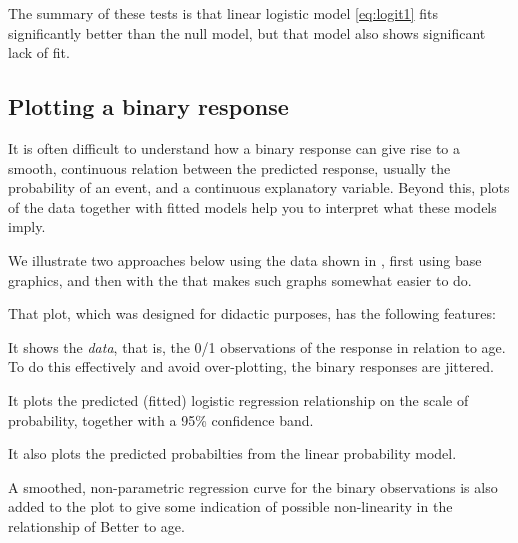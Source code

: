 \documentclass[11pt]{book}
\begin{document}
\begin{itemize}
The summary of these tests is that linear logistic model \eqref{eq:logit1}
fits significantly better than the null model, but that model also shows
significant lack of fit.
\end{itemize}



\subsection{Plotting a binary response}\label{logist:plotting}

It is often difficult to understand how a binary response can give rise to
a smooth, continuous relation between the predicted response, usually
the probability of an event, and a continuous explanatory variable.
Beyond this, plots of the data together with fitted models 
help you to interpret what these models imply.

We illustrate two approaches below using the  data
shown in , first using \R base graphics, and
then with the  that makes such graphs somewhat easier to do.

That plot, which was designed for didactic purposes, has the following features:
\begin{itemize*}
  \item It shows the \emph{data}, that is, the 0/1 observations of the 
  response in relation to age. To do this effectively and avoid over-plotting, the
  binary responses are jittered.
  \item It plots the predicted (fitted) logistic regression relationship on the scale
  of probability, together with a 95\% confidence band.
  \item It also plots the predicted probabilties from the linear probability model.
  \item A smoothed, non-parametric regression curve for the binary observations
  is also added to the plot to give some indication of possible non-linearity in
  the relationship of Better to age.
\end{itemize*}
\end{document}
